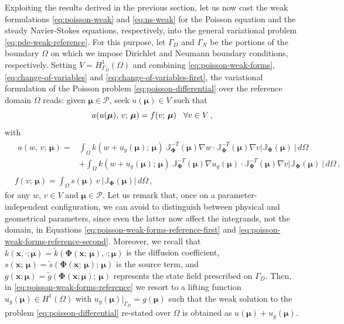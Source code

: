 \documentclass[12pt, a4paper, twoside, openright]{report}
\numberwithin{equation}{chapter}
\theoremstyle{theorem}
\theoremstyle{definition}
\theoremstyle{remark}
\theoremstyle{proposition}
\numberwithin{figure}{chapter}
\newcommand{\wt}[1]{\widetilde{#1}}
\newcommand{\bg}[1]{\boldsymbol{#1}}
\begin{document}
		Exploiting the results derived in the previous section, let us now cast the weak formulations \eqref{eq:poisson-weak} and \eqref{eq:ns-weak} for the Poisson equation and the steady Navier-Stokes equations, respectively, into the general variational problem \eqref{eq:pde-weak-reference}. For this purpose, let $\Gamma_D$ and $\Gamma_N$ be the portions of the boundary $\Omega$ on which we impose Dirichlet and Neumann boundary conditions, respectively. Setting $V = H^1_{\Gamma_D}(\Omega)$ and combining \eqref{eq:poisson-weak-forms}, \eqref{eq:change-of-variables} and \eqref{eq:change-of-variables-first}, the variational formulation of the Poisson problem \eqref{eq:poisson-differential} over the reference domain $\Omega$ reads: given $\bg{\mu} \in \mathcal{P}$, seek $u(\bg{\mu}) \in V$ such that
		\begin{equation}
			\label{eq:poisson-weak-reference}
			a(u(\bg{\mu}), \, v; \, \bg{\mu}) = f(v; \, \bg{\mu}) \hspace*{0.3cm} \forall v \in V \, ,
		\end{equation}
		with
		\begin{subequations}
			\label{eq:poisson-weak-forms-reference}
			\begin{align}
				\label{eq:poisson-weak-forms-reference-first}
				&
				\begin{aligned}
				a(w, \, v; \, \bg{\mu}) = & \int_{\Omega} k(w + u_g(\bg{\mu}); \, \bg{\mu}) ~ \mathbb{J}^{-T}_{\bg{\Phi}}(\bg{\mu}) \nabla w \cdot \mathbb{J}^{-T}_{\bg{\Phi}}(\bg{\mu}) \nabla v \lvert \mathbb{J}_{\bg{\Phi}}(\bg{\mu}) ~ \rvert \, d \Omega \\
				& + \int_{\Omega} k(w + u_g(\bg{\mu}); \, \bg{\mu}) ~ \mathbb{J}^{-T}_{\bg{\Phi}}(\bg{\mu}) \nabla u_g(\bg{\mu}) \cdot \mathbb{J}^{-T}_{\bg{\Phi}}(\bg{\mu}) \nabla v \lvert \mathbb{J}_{\bg{\Phi}}(\bg{\mu}) ~ \rvert \, d \Omega \, ,
				\end{aligned} \\
				\label{eq:poisson-weak-forms-reference-second}
				& f(v; \, \bg{\mu}) = \int_{\Omega} s(\bg{\mu}) ~ v ~ \lvert \mathbb{J}_{\bg{\Phi}}(\bg{\mu}) \rvert \, d \Omega \, ,  
			\end{align}
		\end{subequations}
		for any $w$, $v \in V$ and $\bg{\mu} \in \mathcal{P}$. Let us remark that, once on a parameter-independent configuration, we can avoid to distinguish between physical and geometrical parameters, since even the latter now affect the integrands, not the domain, in Equations \eqref{eq:poisson-weak-forms-reference-first} and \eqref{eq:poisson-weak-forms-reference-second}. Moreover, we recall that $k(\bg{x}, \cdot; \bg{\mu}) = \wt{k}(\bg{\Phi}(\bg{x}; \, \bg{\mu}), \cdot; \bg{\mu})$ is the diffusion coefficient, $s(\bg{x}; \, \bg{\mu}) = \wt{s}(\bg{\Phi}(\bg{x}; \, \bg{\mu}); \, \bg{\mu})$ is the source term, and $g(\bg{x}; \bg{\mu}) = \wt{g}(\bg{\Phi}(\bg{x}; \bg{\mu}); \, \bg{\mu})$ represents the state field prescribed on $\Gamma_D$. Then, in \eqref{eq:poisson-weak-forms-reference} we resort to a lifting function $u_g(\bg{\mu}) \in H^1(\Omega)$ with $u_g(\bg{\mu}) \big\rvert_{\Gamma_D} = g(\bg{\mu})$ such that the weak solution to the problem \eqref{eq:poisson-differential} re-stated over $\Omega$ is obtained as $u(\bg{\mu}) + u_g(\bg{\mu})$.
		
\end{document}
